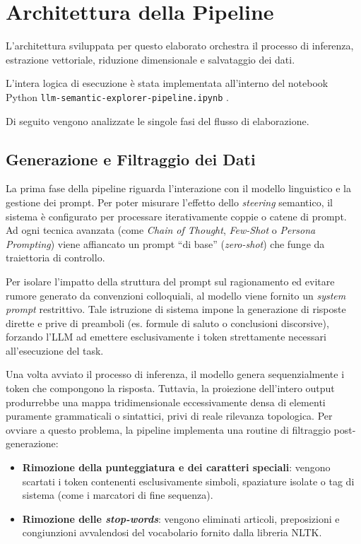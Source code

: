 \section{Architettura della Pipeline}
\label{sec:architettura}

L'architettura sviluppata per questo elaborato orchestra il processo di inferenza, estrazione vettoriale, riduzione dimensionale e salvataggio dei dati. 

L'intera logica di esecuzione è stata implementata all'interno del notebook Python \texttt{llm-semantic-explorer-pipeline.ipynb} \cite{notebook_pipeline}. 

Di seguito vengono analizzate le singole fasi del flusso di elaborazione.

\subsection{Generazione e Filtraggio dei Dati}
\label{sec:gestione_dati}

La prima fase della pipeline riguarda l'interazione con il modello linguistico e la gestione dei prompt. Per poter misurare l'effetto dello \textit{steering} semantico, il sistema è configurato per processare iterativamente coppie o catene di prompt. Ad ogni tecnica avanzata (come \textit{Chain of Thought}, \textit{Few-Shot} o \textit{Persona Prompting}) viene affiancato un prompt ``di base'' (\textit{zero-shot}) che funge da traiettoria di controllo.

Per isolare l'impatto della struttura del prompt sul ragionamento ed evitare rumore generato da convenzioni colloquiali, al modello viene fornito un \textit{system prompt} restrittivo. Tale istruzione di sistema impone la generazione di risposte dirette e prive di preamboli (es. formule di saluto o conclusioni discorsive), forzando l'LLM ad emettere esclusivamente i token strettamente necessari all'esecuzione del task.

Una volta avviato il processo di inferenza, il modello genera sequenzialmente i token che compongono la risposta. Tuttavia, la proiezione dell'intero output produrrebbe una mappa tridimensionale eccessivamente densa di elementi puramente grammaticali o sintattici, privi di reale rilevanza topologica. Per ovviare a questo problema, la pipeline implementa una routine di filtraggio post-generazione:
\begin{itemize}
    \item \textbf{Rimozione della punteggiatura e dei caratteri speciali}: vengono scartati i token contenenti esclusivamente simboli, spaziature isolate o tag di sistema (come i marcatori di fine sequenza).
    \item \textbf{Rimozione delle \textit{stop-words}}: vengono eliminati articoli, preposizioni e congiunzioni avvalendosi del vocabolario fornito dalla libreria NLTK.
\end{itemize}

